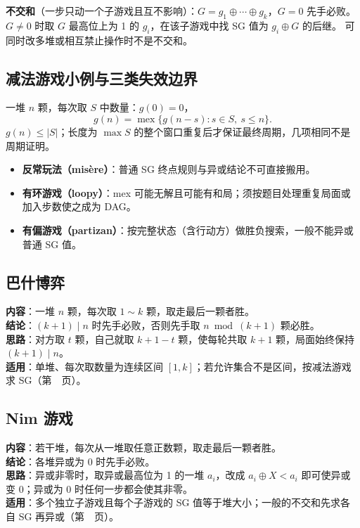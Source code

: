 \textbf{不交和}（一步只动一个子游戏且互不影响）：$G=g_1\oplus\cdots\oplus g_k$，$G=0$ 先手必败。
$G\ne0$ 时取 $G$ 最高位上为 1 的 $g_i$，在该子游戏中找 SG 值为 $g_i\oplus G$ 的后继。
可同时改多堆或相互禁止操作时不是不交和。



\subsection{减法游戏小例与三类失效边界}\label{knowledge-subtraction-game}
一堆 $n$ 颗，每次取 $S$ 中数量：$g(0)=0$，
\[
g(n)=\operatorname{mex}\{g(n-s):s\in S,\ s\le n\}.
\]
$g(n)\le|S|$；长度为 $\max S$ 的整个窗口重复后才保证最终周期，几项相同不是周期证明。
\begin{itemize}
\item \textbf{反常玩法（mis\`ere）}：普通 SG 终点规则与异或结论不可直接搬用。
\item \textbf{有环游戏（loopy）}：mex 可能无解且可能有和局；须按题目处理重复局面或加入步数使之成为 DAG。
\item \textbf{有偏游戏（partizan）}：按完整状态（含行动方）做胜负搜索，一般不能异或普通 SG 值。
\end{itemize}

\label{end-probability-games-supplement}


\subsection{巴什博弈}\label{knowledge-game-bash}
\textbf{内容}：一堆 $n$ 颗，每次取 $1\sim k$ 颗，取走最后一颗者胜。\\
\textbf{结论}：$(k+1)\mid n$ 时先手必败，否则先手取 $n\bmod(k+1)$ 颗必胜。\\
\textbf{思路}：对方取 $t$ 颗，自己就取 $k+1-t$ 颗，使每轮共取 $k+1$ 颗，局面始终保持 $(k+1)\mid n$。\\
\textbf{适用}：单堆、每次取数量为连续区间 $[1,k]$；若允许集合不是区间，按减法游戏求 SG（第~\pageref{knowledge-subtraction-game}~页）。



\subsection{Nim 游戏}\label{knowledge-game-nim}
\textbf{内容}：若干堆，每次从一堆取任意正数颗，取走最后一颗者胜。\\
\textbf{结论}：各堆异或为 $0$ 时先手必败。\\
\textbf{思路}：异或非零时，取异或最高位为 1 的一堆 $a_i$，改成 $a_i\oplus X<a_i$ 即可使异或变 $0$；异或为 $0$ 时任何一步都会使其非零。\\
\textbf{适用}：多个独立子游戏且每个子游戏的 SG 值等于堆大小；一般的不交和先求各自 SG 再异或（第~\pageref{knowledge-sg}~页）。



